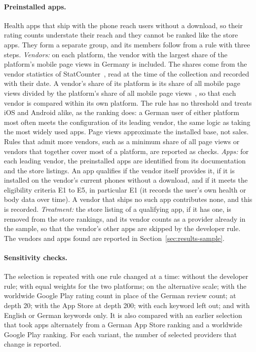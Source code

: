 \documentclass[twoside,its]{bossthesis}
\begin{document}
\paragraph{Preinstalled apps.} Health apps that ship with the phone reach
users without a download, so their rating counts understate their reach and
they cannot be ranked like the store apps. They form a separate group, and
its members follow from a rule with three steps.
\emph{Vendors:} on each platform, the vendor with the largest share of the
platform's mobile page views in Germany is included. The shares come from the
vendor statistics of StatCounter~\parencite{statcounter2026vendor}, read at the
time of the collection and recorded with their date. A vendor's share of its
platform is its share of all mobile page views divided by the platform's share
of all mobile page views~\parencite{statcounter2026os}, so that each vendor is
compared within its own platform. The rule has no threshold and treats iOS and
Android alike, as the ranking does: a German user of either platform most often
meets the configuration of its leading vendor, the same logic as taking the
most widely used apps. Page views approximate the installed base, not sales.
Rules that admit more vendors, such as a minimum share of all page views or
vendors that together cover most of a platform, are reported as checks.
\emph{Apps:} for each leading vendor, the preinstalled apps are identified from
its documentation and the store listings. An app qualifies if the vendor itself
provides it, if it is installed on the vendor's current phones without a
download, and if it meets the eligibility criteria E1 to E5, in particular E1
(it records the user's own health or body data over time). A vendor that ships
no such app contributes none, and this is recorded.
\emph{Treatment:} the store listing of a qualifying app, if it has one, is
removed from the store rankings, and its vendor counts as a provider already in
the sample, so that the vendor's other apps are skipped by the developer rule.
The vendors and apps found are reported in Section~\ref{sec:results-sample}.

\paragraph{Sensitivity checks.} The selection is repeated with one rule changed
at a time: without the developer rule; with equal weights for the two
platforms; on the alternative scale; with the worldwide Google Play rating count
in place of the German review count; at depth 20; with the App Store at depth
200; with each keyword left out; and with English or German keywords only. It
is also compared with an earlier selection that took apps alternately from a
German App Store ranking and a worldwide Google Play ranking. For each variant,
the number of selected providers that change is reported.
\end{document}
